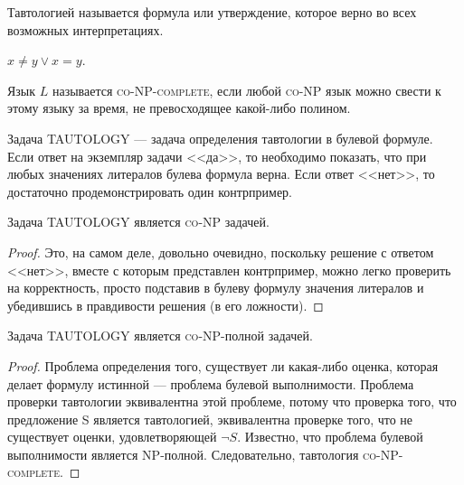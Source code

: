     \begin{Def}[Тавтология]
        Тавтологией называется формула или утверждение, которое верно во всех возможных интерпретациях.
    \end{Def}
    \begin{Example}
        $x \neq y \lor x = y$.
    \end{Example}
    \begin{Def}
        Язык $L$ называется \textsc{co-NP-complete}, если любой \textsc{co-NP} язык можно свести к этому языку за время, не превосходящее какой-либо полином.
    \end{Def}
    \begin{Def}
        Задача \textsc{TAUTOLOGY} --- задача определения тавтологии в булевой формуле. Если ответ на экземпляр задачи <<да>>, то необходимо показать, что при любых значениях литералов булева формула верна. Если ответ <<нет>>, то достаточно продемонстрировать один контрпример.
    \end{Def}
    \begin{Thm}
        Задача \textsc{TAUTOLOGY} является \textsc{co-NP} задачей.
    \end{Thm}
    \begin{proof}
        Это, на самом деле, довольно очевидно, поскольку решение с ответом <<нет>>, вместе с которым представлен контрпример, можно легко проверить на корректность, просто подставив в булеву формулу значения литералов и убедившись в правдивости решения (в его ложности).
    \end{proof}
    \begin{Thm}
        Задача \textsc{TAUTOLOGY} является \textsc{co-NP}-полной задачей.
    \end{Thm}
    \begin{proof}
        Проблема определения того, существует ли какая-либо оценка, которая делает формулу истинной --- проблема булевой выполнимости. Проблема проверки тавтологии эквивалентна этой проблеме, потому что проверка того, что предложение S является тавтологией, эквивалентна проверке того, что не существует оценки, удовлетворяющей $\lnot S$. Известно, что проблема булевой выполнимости является \textsc{NP}-полной. Следовательно, тавтология \textsc{co-NP-complete}. 
    \end{proof}
    
    
    

